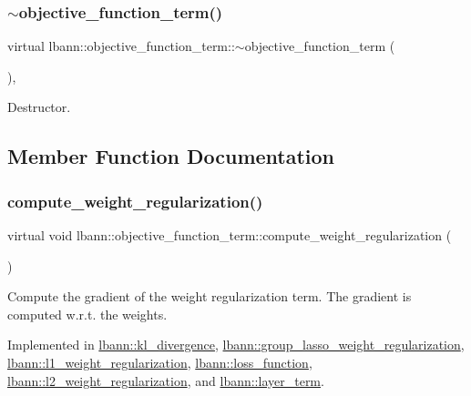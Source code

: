\subsubsection{\texorpdfstring{$\sim$objective\+\_\+function\+\_\+term()}{~objective\_function\_term()}}
{\footnotesize\ttfamily virtual lbann\+::objective\+\_\+function\+\_\+term\+::$\sim$objective\+\_\+function\+\_\+term (\begin{DoxyParamCaption}{ }\end{DoxyParamCaption})\hspace{0.3cm}{\ttfamily [virtual]}, {\ttfamily [default]}}

Destructor. 

\subsection{Member Function Documentation}
\mbox{\label{classlbann_1_1objective__function__term_a134cf89caed45527bbe9d811a0b93dfc}} 
\subsubsection{\texorpdfstring{compute\+\_\+weight\+\_\+regularization()}{compute\_weight\_regularization()}}
{\footnotesize\ttfamily virtual void lbann\+::objective\+\_\+function\+\_\+term\+::compute\+\_\+weight\+\_\+regularization (\begin{DoxyParamCaption}{ }\end{DoxyParamCaption})\hspace{0.3cm}{\ttfamily [pure virtual]}}

Compute the gradient of the weight regularization term. The gradient is computed w.\+r.\+t. the weights. 

Implemented in \hyperlink{classlbann_1_1kl__divergence_a6f9e18587348fa8dc6871c404232f121}{lbann\+::kl\+\_\+divergence}, \hyperlink{classlbann_1_1group__lasso__weight__regularization_a9d721928716349c8327ca67257fb827a}{lbann\+::group\+\_\+lasso\+\_\+weight\+\_\+regularization}, \hyperlink{classlbann_1_1l1__weight__regularization_a9f2c29799fc60449f65bc1127b7514fb}{lbann\+::l1\+\_\+weight\+\_\+regularization}, \hyperlink{classlbann_1_1loss__function_acd6e3bdcf33235208db03ab7af88e961}{lbann\+::loss\+\_\+function}, \hyperlink{classlbann_1_1l2__weight__regularization_a1dce8a486660335097f5ad239b343e39}{lbann\+::l2\+\_\+weight\+\_\+regularization}, and \hyperlink{classlbann_1_1layer__term_ab082c3a6feb225abb8e55595373532bf}{lbann\+::layer\+\_\+term}.


